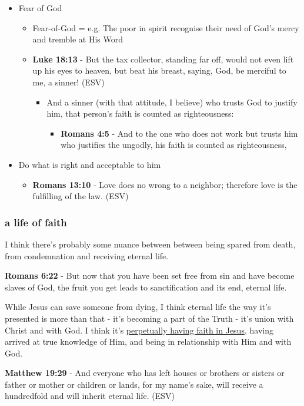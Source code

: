\documentclass[11pt]{article}
\begin{document}
\begin{itemize}
\item Fear of God
\begin{itemize}
\item Fear-of-God = e.g. The poor in spirit recognise their need of God's mercy and tremble at His Word
\item \textbf{Luke 18:13} - But the tax collector, standing far off, would not even lift up his eyes to heaven, but beat his breast, saying, God, be merciful to me, a sinner! (ESV)
\begin{itemize}
\item And a sinner (with that attitude, I believe) who trusts God to justify him, that person's faith is counted as righteousness:
\begin{itemize}
\item \textbf{Romans 4:5} - And to the one who does not work but trusts him who justifies the ungodly, his faith is counted as righteousness,
\end{itemize}
\end{itemize}
\end{itemize}
\item Do what is right and acceptable to him
\begin{itemize}
\item \textbf{Romans 13:10} - Love does no wrong to a neighbor; therefore love is the fulfilling of the law. (ESV)
\end{itemize}
\end{itemize}

\subsubsection{a life of faith}
\label{sec:org405ce1d}
I think there's probably some nuance between between being spared from death, from condemnation and receiving eternal life.

\textbf{Romans 6:22} - But now that you have been set free from sin and have become slaves of God, the fruit you get leads to sanctification and its end, eternal life.

While Jesus can save someone from dying, I think eternal life the way it's presented is more than that - it's becoming a part of the Truth - it's union with Christ and with God.
I think it's \uline{perpetually having faith in Jesus}, having arrived at true knowledge of Him, and being in relationship with Him and with God.

\textbf{Matthew 19:29} - And everyone who has left houses or brothers or sisters or father or mother or children or lands, for my name's sake, will receive a hundredfold and will inherit eternal life. (ESV)
\end{document}
